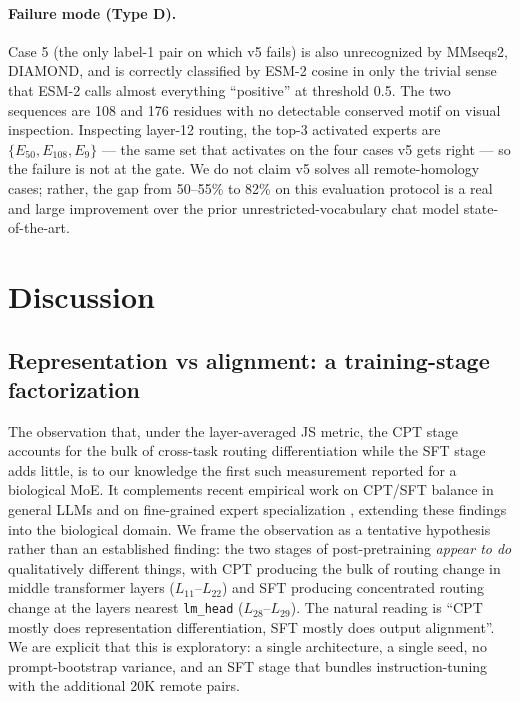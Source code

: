 \documentclass[11pt]{article}
\begin{document}
\paragraph{Failure mode (Type D).}
Case 5 (the only label-1 pair on which v5 fails) is also unrecognized by MMseqs2, DIAMOND, and is correctly classified by ESM-2 cosine in only the trivial sense that ESM-2 calls almost everything ``positive'' at threshold 0.5. The two sequences are 108 and 176 residues with no detectable conserved motif on visual inspection. Inspecting layer-12 routing, the top-3 activated experts are $\{E_{50}, E_{108}, E_9\}$ --- the same set that activates on the four cases v5 gets right --- so the failure is not at the gate. We do not claim v5 solves all remote-homology cases; rather, the gap from 50--55\% to 82\% on this evaluation protocol is a real and large improvement over the prior unrestricted-vocabulary chat model state-of-the-art.

\section{Discussion}
\label{sec:discussion}

\subsection{Representation vs alignment: a training-stage factorization}

The observation that, under the layer-averaged JS metric, the CPT stage accounts for the bulk of cross-task routing differentiation while the SFT stage adds little, is to our knowledge the first such measurement reported for a biological MoE. It complements recent empirical work on CPT/SFT balance in general LLMs \citep{ibrahim2024cpt, jindal2024balance} and on fine-grained expert specialization \citep{dai2024deepseekmoe, kanai2025moeinterp}, extending these findings into the biological domain. We frame the observation as a tentative hypothesis rather than an established finding: the two stages of post-pretraining \emph{appear to do} qualitatively different things, with CPT producing the bulk of routing change in middle transformer layers ($L_{11}$--$L_{22}$) and SFT producing concentrated routing change at the layers nearest \texttt{lm\_head} ($L_{28}$--$L_{29}$). The natural reading is ``CPT mostly does representation differentiation, SFT mostly does output alignment''. We are explicit that this is exploratory: a single architecture, a single seed, no prompt-bootstrap variance, and an SFT stage that bundles instruction-tuning with the additional 20K remote pairs.
\end{document}
